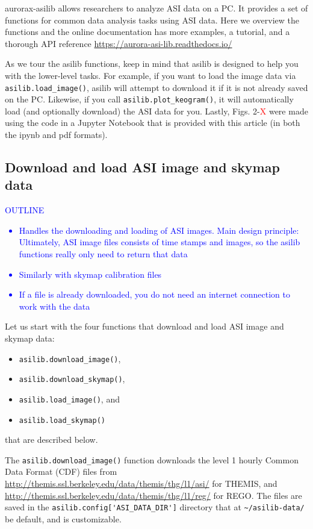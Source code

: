 \documentclass[draft]{agujournal2019}
\begin{document}
aurorax-asilib allows researchers to analyze ASI data on a PC. It provides a set of functions for common data analysis tasks using ASI data. Here we overview the functions and the online documentation has more examples, a tutorial, and a thorough API reference \url{https://aurora-asi-lib.readthedocs.io/}

As we tour the asilib functions, keep in mind that asilib is designed to help you with the lower-level tasks. For example, if you want to load the image data via \verb|asilib.load_image()|, asilib will attempt to download it if it is not already saved on the PC. Likewise, if you call \verb|asilib.plot_keogram()|, it will automatically load (and optionally download) the ASI data for you. Lastly, Figs. 2-\textcolor{red}{X} were made using the code in a Jupyter Notebook that is provided with this article (in both the ipynb and pdf formats).

\subsection{Download and load ASI image and skymap data}
\textcolor{blue}{
      OUTLINE
      \begin{itemize}
            \item Handles the downloading and loading of ASI images. Main design principle: Ultimately, ASI image files consists of time stamps and images, so the asilib functions really only need to return that data
            \item Similarly with skymap calibration files
            \item If a file is already downloaded, you do not need an internet connection to work with the data
      \end{itemize}
}

Let us start with the four functions that download and load ASI image and skymap data: 

\begin{itemize}
      \item \verb|asilib.download_image()|,
      \item \verb|asilib.download_skymap()|,
      \item \verb|asilib.load_image()|, and
      \item \verb|asilib.load_skymap()|
\end{itemize} that are described below.

The \verb|asilib.download_image()| function downloads the level 1 hourly Common Data Format (CDF) files from \url{http://themis.ssl.berkeley.edu/data/themis/thg/l1/asi/} for THEMIS, and \url{http://themis.ssl.berkeley.edu/data/themis/thg/l1/reg/} for REGO. The files are saved in the \verb|asilib.config['ASI_DATA_DIR']| directory that at \verb|~/asilib-data/| be default, and is customizable.
\end{document}
